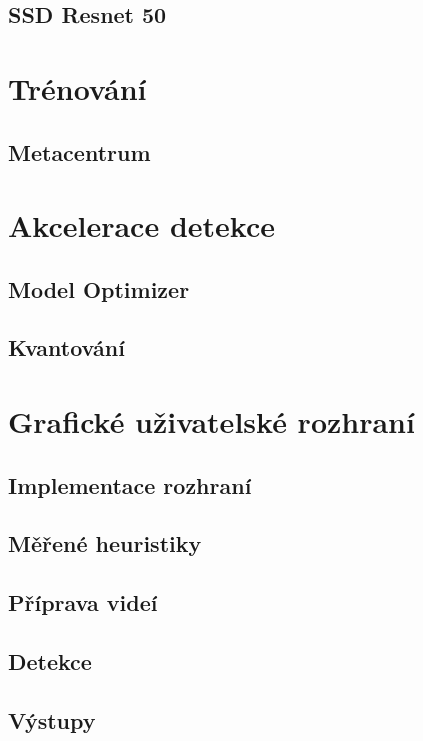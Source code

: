 \subsection*{SSD Resnet 50}

\section{Trénování}

\subsection*{Metacentrum}


\section{Akcelerace detekce}
\label{sekce:akcelerace_implementace}

\subsection*{Model Optimizer}

\subsection*{Kvantování}

\section{Grafické uživatelské rozhraní}
\label{sekce:gui}

\subsection*{Implementace rozhraní}

\subsection*{Měřené heuristiky}

\subsection*{Příprava videí}


\subsection*{Detekce}


\subsection*{Výstupy}

